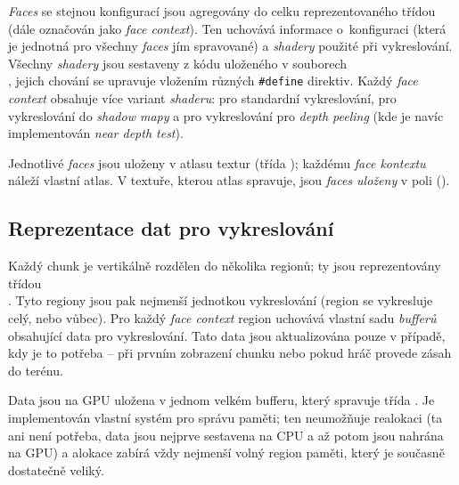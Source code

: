 \textit{Faces} se stejnou konfigurací jsou agregovány do celku reprezentovaného třídou \\ (dále označován jako \textit{face context}). Ten uchovává informace o~konfiguraci (která je jednotná pro všechny \textit{faces} jím spravované) a \textit{shadery} použité při vykreslování. Všechny \textit{shadery} jsou sestaveny z kódu uloženého v souborech \\, jejich chování se upravuje vložením různých \verb|#define| direktiv. Každý \textit{face context} obsahuje více variant \textit{shaderu}: pro standardní vykreslování, pro vykreslování do \textit{shadow mapy} a pro vykreslování pro \textit{depth peeling} (kde je navíc implementován \textit{near depth test}).

Jednotlivé \textit{faces} jsou uloženy v atlasu textur (třída ); každému \textit{face kontextu} náleží vlastní atlas. V textuře, kterou atlas spravuje, jsou \textit{faces uloženy} v poli ().

\subsection{Reprezentace dat pro vykreslování}
Každý chunk je vertikálně rozdělen do několika regionů; ty jsou reprezentovány třídou \\. Tyto regiony jsou pak nejmenší jednotkou vykreslování (region se vykresluje celý, nebo vůbec). Pro každý \textit{face context} region uchovává vlastní sadu \textit{bufferů} obsahující data pro vykreslování. Tato data jsou aktualizována pouze v případě, kdy je to potřeba -- při prvním zobrazení chunku nebo pokud hráč provede zásah do terénu.

Data jsou na GPU uložena v jednom velkém bufferu, který spravuje třída . Je implementován vlastní systém pro správu paměti; ten neumožňuje realokaci (ta ani není potřeba, data jsou nejprve sestavena na CPU a až potom jsou nahrána na GPU) a alokace zabírá vždy nejmenší volný region paměti, který je současně dostatečně veliký.

